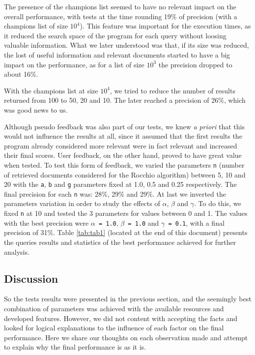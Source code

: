 \documentclass[12pt]{article}
\begin{document}
The presence of the champions list seemed to have no relevant impact on the 
overall performance, with tests at the time rounding 19\% of precision
(with a champions list of size $10^4$).
This feature was important for the execution times, as it reduced the search 
space of the program for each query without loosing valuable information.
What we later understood was that, if its size was reduced, the lost of useful
information and relevant documents started to have a big impact on the performance,
as for a list of size $10^3$ the precision dropped to about 16\%.

With the champions list at size $10^4$, we tried to reduce the number of results
returned from 100 to 50, 20 and 10. 
The later reached a precision of 26\%, which was good news to us.

Although pseudo feedback was also part of our tests, we knew \textit{a priori} 
that this would not influence the results at all, since it assumed that the first
results the program already considered more relevant were in fact relevant and 
increased their final scores.
User feedback, on the other hand, proved to have great value when tested.
To test this form of feedback, we varied the parameters \texttt{n} (number of 
retrieved documents considered for the Rocchio algorithm) between 5, 10 and 20
with the \texttt{a}, \texttt{b} and \texttt{g} parameters fixed at 1.0, 0.5 and
0.25 respectively.
The final precision for each \texttt{n} was: 28\%, 29\% and 29\%. 
At last we inverted the parameters variation in order to study the effects of 
$\alpha$, $\beta$ and $\gamma$.
To do this, we fixed \texttt{n} at 10 and tested the 3 parameters for values
between 0 and 1.
The values with the best precision were \texttt{$\alpha$ = 1.0}, 
\texttt{$\beta$ = 1.0} and \texttt{$\gamma$ = 0.1}, with a final precision of 31\%.
Table \ref{tab:tab1} (located at the end of this document) presents the queries results
and statistics of the best performance achieved for further analysis.

\subsection{Discussion}\label{discussion}

So the tests results were presented in the previous section, and the seemingly
best combination of parameters was achieved with the available resources and 
developed features.
However, we did not content with accepting the facts and looked for logical
explanations to the influence of each factor on the final performance.
Here we share our thoughts on each observation made and attempt to explain why
the final performance is as it is.
\end{document}
